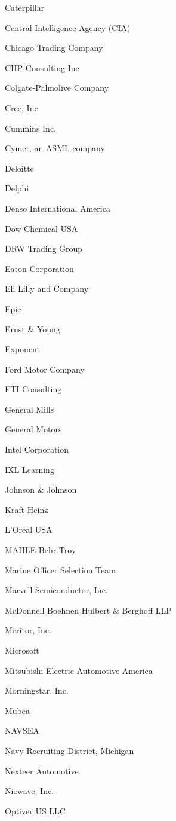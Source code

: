 \documentclass[twoside]{article}
\begin{document}
\begin{center}
\begin{multicols}{5}
\begin{FlushLeft}
\begin{compactitem}
\item Caterpillar
\item Central Intelligence Agency (CIA)
\item Chicago Trading Company
\item CHP Consulting Inc
\item Colgate-Palmolive Company
\item Cree, Inc
\item Cummins Inc.
\item Cymer, an ASML company
\item Deloitte
\item Delphi
\item Denso International America
\item Dow Chemical USA
\item DRW Trading Group
\item Eaton Corporation
\item Eli Lilly and Company
\item Epic
\item Ernst \& Young
\item Exponent
\item Ford Motor Company
\item FTI Consulting
\item General Mills
\item General Motors
\item Intel Corporation
\item IXL Learning
\item Johnson \& Johnson
\item Kraft Heinz
\item L'Oreal USA
\item MAHLE Behr Troy
\item Marine Officer Selection Team
\item Marvell Semiconductor, Inc.
\item McDonnell Boehnen Hulbert \& Berghoff LLP
\item Meritor, Inc.
\item Microsoft
\item Mitsubishi Electric Automotive America
\item Morningstar, Inc.
\item Mubea
\item NAVSEA
\item Navy Recruiting District, Michigan
\item Nexteer Automotive
\item Niowave, Inc.
\item Optiver US LLC

\end{compactitem}
\end{FlushLeft}
\end{multicols}
\end{center}
\end{document}
